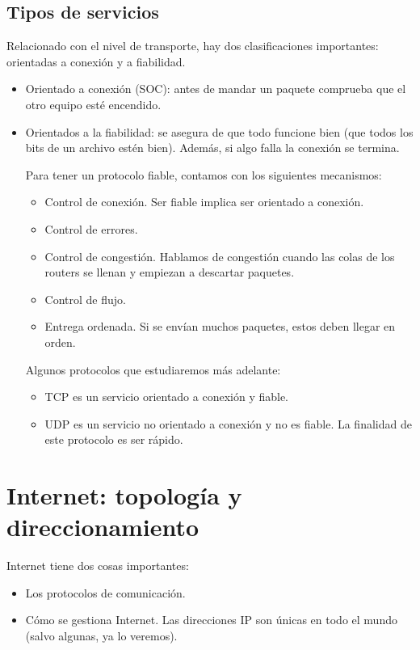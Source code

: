 \subsection{Tipos de servicios}
Relacionado con el nivel de transporte, hay dos clasificaciones importantes: orientadas a conexión y a fiabilidad. 
\begin{itemize}
    \item Orientado a conexión (SOC): antes de mandar un paquete comprueba que el otro equipo esté encendido. 
        
    \item Orientados a la fiabilidad: se asegura de que todo funcione bien (que todos los bits de un archivo estén bien). Además, si algo falla la conexión se termina. 

     Para tener un protocolo fiable, contamos con los siguientes mecanismos: 
    \begin{itemize}
        \item Control de conexión. Ser fiable implica ser orientado a conexión. 
        \item Control de errores. 
        \item Control de congestión. Hablamos de congestión cuando las colas de los routers se llenan y empiezan a descartar paquetes. 
        \item Control de flujo. 
        \item Entrega ordenada. Si se envían muchos paquetes, estos deben llegar en orden. 
    \end{itemize}

    Algunos protocolos que estudiaremos más adelante: 
    \begin{itemize}
        \item TCP es un servicio orientado a conexión y fiable.
        \item UDP es un servicio no orientado a conexión y no es fiable. La finalidad de este protocolo es ser rápido. 
    \end{itemize}
\end{itemize}


\section{Internet: topología y direccionamiento}
Internet tiene dos cosas importantes:
\begin{itemize}
    \item Los protocolos de comunicación.
    \item Cómo se gestiona Internet. Las direcciones IP son únicas en todo el mundo (salvo algunas, ya lo veremos).
\end{itemize}

